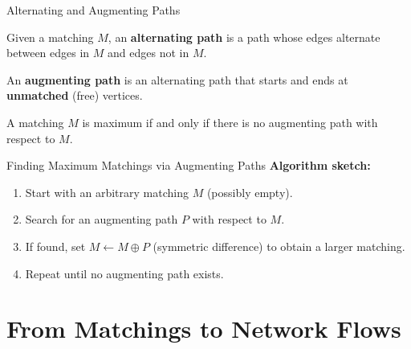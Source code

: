 \documentclass[aspectratio=169]{beamer}
\begin{document}
\begin{frame}{Alternating and Augmenting Paths}
  \begin{definition}
    Given a matching $M$, an \textbf{alternating path} is a path whose edges
    alternate between edges in $M$ and edges not in $M$.
  \end{definition}

  \begin{definition}
    An \textbf{augmenting path} is an alternating path that starts and ends at
    \textbf{unmatched} (free) vertices.
  \end{definition}

  \begin{theorem}
    A matching $M$ is maximum if and only if there is no augmenting path with
    respect to $M$.
  \end{theorem}
\end{frame}

\begin{frame}{Finding Maximum Matchings via Augmenting Paths}
  \textbf{Algorithm sketch:}
  \begin{enumerate}
    \item Start with an arbitrary matching $M$ (possibly empty).
    \item Search for an augmenting path $P$ with respect to $M$.
    \item If found, set $M \leftarrow M \oplus P$ (symmetric difference) to
          obtain a larger matching.
    \item Repeat until no augmenting path exists.
  \end{enumerate}

  \vspace{1em}
\end{frame}

\section{From Matchings to Network Flows}
\end{document}
